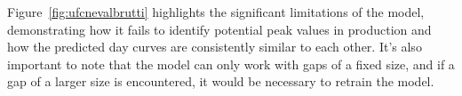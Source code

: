 Figure~\ref{fig:ufcnevalbrutti} highlights the significant limitations
of the model, demonstrating how it fails to identify potential peak
values in production and how the predicted day curves are consistently similar
to each other.
It's also important to note that the model can only work with
gaps of a fixed size, and if a gap of a larger size is encountered,
it would be necessary to retrain the model.

